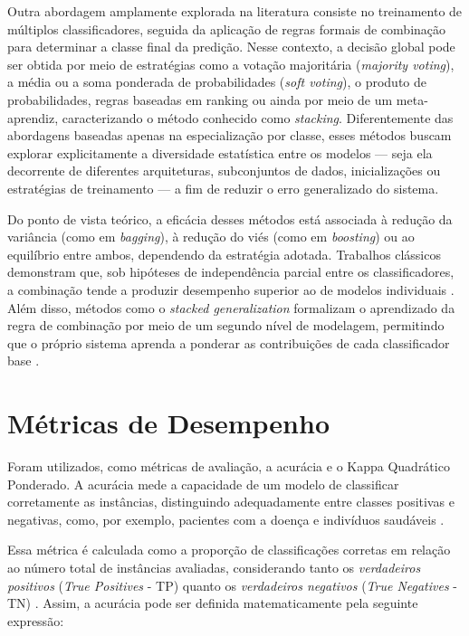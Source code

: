 Outra abordagem amplamente explorada na literatura consiste no treinamento de múltiplos classificadores, seguida da aplicação de regras formais de combinação para determinar a classe final da predição. Nesse contexto, a decisão global pode ser obtida por meio de estratégias como a votação majoritária (\textit{majority voting}), a média ou a soma ponderada de probabilidades (\textit{soft voting}), o produto de probabilidades, regras baseadas em ranking ou ainda por meio de um meta-aprendiz, caracterizando o método conhecido como \textit{stacking}. Diferentemente das abordagens baseadas apenas na especialização por classe, esses métodos buscam explorar explicitamente a diversidade estatística entre os modelos — seja ela decorrente de diferentes arquiteturas, subconjuntos de dados, inicializações ou estratégias de treinamento — a fim de reduzir o erro generalizado do sistema.

Do ponto de vista teórico, a eficácia desses métodos está associada à redução da variância (como em \textit{bagging}), à redução do viés (como em \textit{boosting}) ou ao equilíbrio entre ambos, dependendo da estratégia adotada. Trabalhos clássicos demonstram que, sob hipóteses de independência parcial entre os classificadores, a combinação tende a produzir desempenho superior ao de modelos individuais \cite{dietterich2000ensemble, kuncheva2004combining}. Além disso, métodos como o \textit{stacked generalization} formalizam o aprendizado da regra de combinação por meio de um segundo nível de modelagem, permitindo que o próprio sistema aprenda a ponderar as contribuições de cada classificador base \cite{wolpert1992stacked}.


\section{Métricas de Desempenho}
Foram utilizados, como métricas de avaliação, a acurácia e o Kappa Quadrático Ponderado. A acurácia mede a capacidade de um modelo de classificar corretamente as instâncias, distinguindo adequadamente entre classes positivas e negativas, como, por exemplo, pacientes com a doença e indivíduos saudáveis \cite{baratloo2015part}.

Essa métrica é calculada como a proporção de classificações corretas em relação ao número total de instâncias avaliadas, considerando tanto os \textit{verdadeiros positivos} (\textit{True Positives} - TP) quanto os \textit{verdadeiros negativos} (\textit{True Negatives} - TN) \cite{baratloo2015part}. Assim, a acurácia pode ser definida matematicamente pela seguinte expressão:

